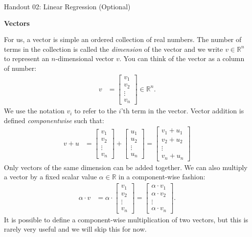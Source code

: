 \documentclass[12pt,hidelinks]{article}
\numberwithin{equation}{section}
\begin{document}
{\LARGE Handout 02: Linear Regression (Optional)}

\vspace*{18pt}


\textbf{Vectors}

For us, a vector is simple an ordered collection of real numbers. The number
of terms in the collection is called the \textit{dimension} of the vector and
we write $v \in \mathbb{R}^n$ to represent an $n$-dimensional vector $v$. You
can think of the vector as a column of number:
\begin{align}
v &= \begin{bmatrix} v_1 \\ v_2 \\ \vdots \\ v_n \end{bmatrix} \in \mathbb{R}^n.
\end{align}
We use the notation $v_i$ to refer to the $i$'th term in the vector. Vector
addition is defined \textit{componentwise} such that:
\begin{align}
v + u &= \begin{bmatrix} v_1 \\ v_2 \\ \vdots \\ v_n \end{bmatrix} +
\begin{bmatrix} u_1 \\ u_2 \\ \vdots \\ u_n \end{bmatrix}
=\begin{bmatrix} v_1 + u_1 \\ v_2 + u_2 \\ \vdots \\ v_n + u_n \end{bmatrix}
\end{align}
Only vectors of the same dimension can be added together. We can also multiply
a vector by a fixed scalar value $\alpha \in \mathbb{R}$ in a component-wise
fashion:
\begin{align}
\alpha \cdot v &= \alpha \cdot \begin{bmatrix} v_1 \\ v_2 \\ \vdots \\ v_n \end{bmatrix}
= \begin{bmatrix} \alpha \cdot v_1 \\ \alpha \cdot v_2 \\ \vdots \\ \alpha \cdot v_n \end{bmatrix}.
\end{align}
It is possible to define a component-wise multiplication of two vectors, but
this is rarely very useful and we will skip this for now.
\end{document}

